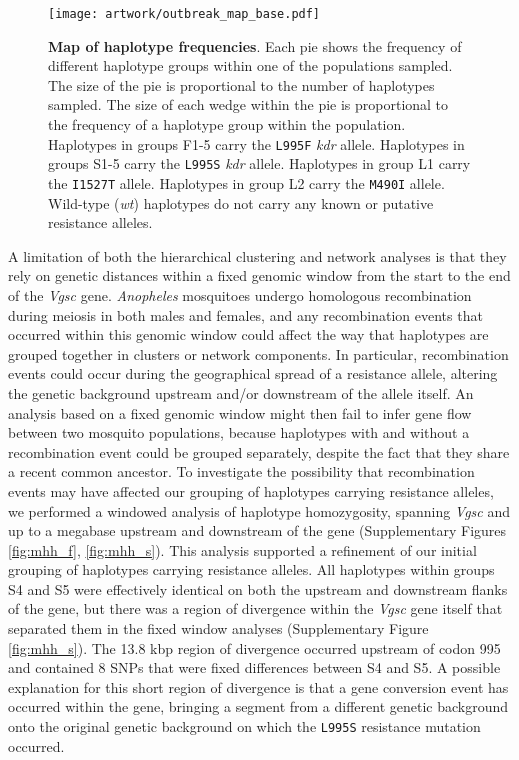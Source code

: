 \documentclass[a4paper,11pt,abstracton,hidelinks]{scrartcl}
\begin{document}
%
\begin{figure}[!t]
  \texttt{[image: artwork/outbreak\_map\_base.pdf]}
  \caption{\textbf{Map of haplotype frequencies}. Each pie shows the frequency of different haplotype groups within one of the populations sampled. The size of the pie is proportional to the number of haplotypes sampled. The size of each wedge within the pie is proportional to the frequency of a haplotype group within the population. Haplotypes in groups F1-5 carry the \texttt{L995F} \textit{kdr} allele. Haplotypes in groups S1-5 carry the \texttt{L995S} \textit{kdr} allele. Haplotypes in group L1 carry the \texttt{I1527T} allele. Haplotypes in group L2 carry the \texttt{M490I} allele. Wild-type (\textit{wt}) haplotypes do not carry any known or putative resistance alleles.}
  \label{fig:map}
\end{figure}


%
A limitation of both the hierarchical clustering and network analyses is that they rely on genetic distances within a fixed genomic window from the start to the end of the \textit{Vgsc} gene.
%
\textit{Anopheles} mosquitoes undergo homologous recombination during meiosis in both males and females, and any recombination events that occurred within this genomic window could affect the way that haplotypes are grouped together in clusters or network components.
%
In particular, recombination events could occur during the geographical spread of a resistance allele, altering the genetic background upstream and/or downstream of the allele itself.
%
An analysis based on a fixed genomic window might then fail to infer gene flow between two mosquito populations, because haplotypes with and without a recombination event could be grouped separately, despite the fact that they share a recent common ancestor.
%
To investigate the possibility that recombination events may have affected our grouping of haplotypes carrying resistance alleles, we performed a windowed analysis of haplotype homozygosity, spanning \textit{Vgsc} and up to a megabase upstream and downstream of the gene (Supplementary Figures \ref{fig:mhh_f}, \ref{fig:mhh_s}).
%
This analysis supported a refinement of our initial grouping of haplotypes carrying resistance alleles.
%
All haplotypes within groups S4 and S5 were effectively identical on both the upstream and downstream flanks of the gene, but there was a region of divergence within the \textit{Vgsc} gene itself that separated them in the fixed window analyses (Supplementary Figure \ref{fig:mhh_s}).
%
The 13.8 kbp region of divergence occurred upstream of codon 995 and contained 8 SNPs that were fixed differences between S4 and S5.
%
A possible explanation for this short region of divergence is that a gene conversion event has occurred within the gene, bringing a segment from a different genetic background onto the original genetic background on which the \texttt{L995S} resistance mutation occurred.
%
\end{document}
